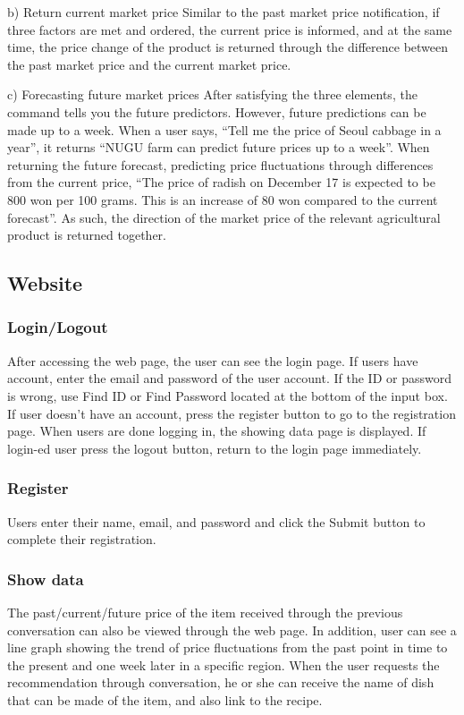 \documentclass[conference]{IEEEtran}
\begin{document}
b)  Return current market price
Similar to the past market price notification, if three factors are met and ordered, the current price is informed, and at the same time, the price change of the product is returned through the difference between the past market price and the current market price.

c) Forecasting future market prices
After satisfying the three elements, the command tells you the future predictors. However, future predictions can be made up to a week. When a user says, “Tell me the price of Seoul cabbage in a year”, it returns “NUGU farm can predict future prices up to a week”. When returning the future forecast, predicting price fluctuations through differences from the current price, “The price of radish on December 17 is expected to be 800 won per 100 grams. This is an increase of 80 won compared to the current forecast”.  As such, the direction of the market price of the relevant agricultural product is returned together.

\subsection{Website}
\subsubsection{Login/Logout}
After accessing the web page, the user can see the login page. If users have account, enter the email and password of the user account.  If the ID or password is wrong, use Find ID or Find Password located at the bottom of the input box. If user doesn't have an account, press the register button to go to the registration page. When users are done logging in, the showing data page is displayed. If login-ed user press the logout button, return to the login page immediately.
\subsubsection{Register}
Users enter their name, email, and password and click the Submit button to complete their registration.
\subsubsection{Show data}
The past/current/future price of the item received through the previous conversation can also be viewed through the web page. In addition, user can see a line graph showing the trend of price fluctuations from the past point in time to the present and one week later in a specific region. When the user requests the recommendation through conversation, he or she can receive the name of dish that can be made of the item, and also link to the recipe.
\end{document}
